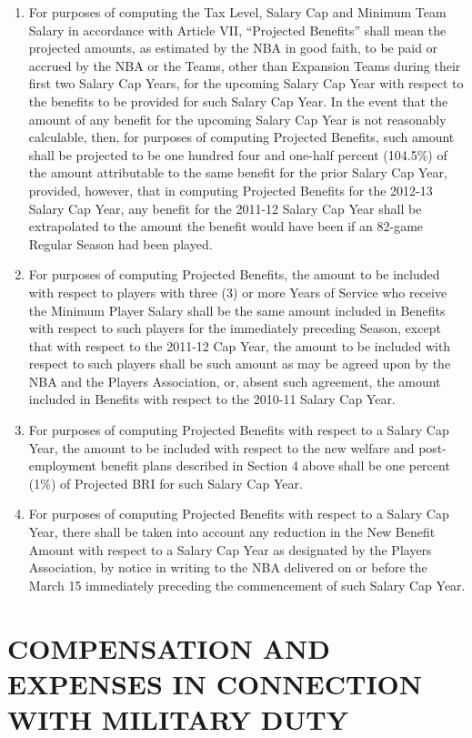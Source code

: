 \documentclass[
]{book}
\providecommand{\tightlist}{%
  \setlength{\itemsep}{0pt}\setlength{\parskip}{0pt}}
\begin{document}
\begin{enumerate}
\def\labelenumi{(\alph{enumi})}
\tightlist
\item
  For purposes of computing the Tax Level, Salary Cap and Minimum Team Salary in accordance with Article VII, ``Projected Benefits'' shall mean the projected amounts, as estimated by the NBA in good faith, to be paid or accrued by the NBA or the Teams, other than Expansion Teams during their first two Salary Cap Years, for the upcoming Salary Cap Year with respect to the benefits to be provided for such Salary Cap Year. In the event that the amount of any benefit for the upcoming Salary Cap Year is not reasonably calculable, then, for purposes of computing Projected Benefits, such amount shall be projected to be one hundred four and one-half percent (104.5\%) of the amount attributable to the same benefit for the prior Salary Cap Year, provided, however, that in computing Projected Benefits for the 2012-13 Salary Cap Year, any benefit for the 2011-12 Salary Cap Year shall be extrapolated to the amount the benefit would have been if an 82-game Regular Season had been played.
\item
  For purposes of computing Projected Benefits, the amount to be included with respect to players with three (3) or more Years of Service who receive the Minimum Player Salary shall be the same amount included in Benefits with respect to such players for the immediately preceding Season, except that with respect to the 2011-12 Cap Year, the amount to be included with respect to such players shall be such amount as may be agreed upon by the NBA and the Players Association, or, absent such agreement, the amount included in Benefits with respect to the 2010-11 Salary Cap Year.
\item
  For purposes of computing Projected Benefits with respect to a Salary Cap Year, the amount to be included with respect to the new welfare and post-employment benefit plans described in Section 4 above shall be one percent (1\%) of Projected BRI for such Salary Cap Year.
\item
  For purposes of computing Projected Benefits with respect to a Salary Cap Year, there shall be taken into account any reduction in the New Benefit Amount with respect to a Salary Cap Year as designated by the Players Association, by notice in writing to the NBA delivered on or before the March 15 immediately preceding the commencement of such Salary Cap Year.
\end{enumerate}

\hypertarget{compensation-and-expenses-in-connection-with-military-duty}{%
\chapter{COMPENSATION AND EXPENSES IN CONNECTION WITH MILITARY DUTY}\label{compensation-and-expenses-in-connection-with-military-duty}}
\end{document}
